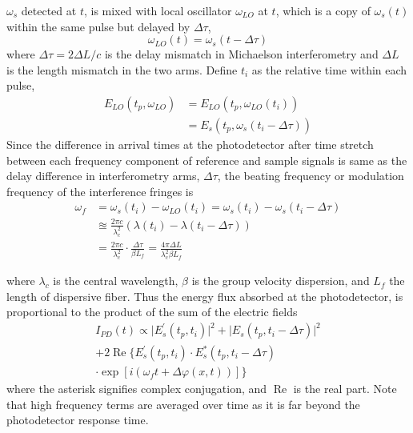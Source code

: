 \documentclass[aps,pra,reprint,superscriptaddress]{revtex4-1}
\begin{document}
$\omega_s$ detected at $t$, is mixed with local oscillator $\omega_{LO}$ at $t$, which is a copy of $\omega_s(t)$ within the same pulse but delayed by $\Delta\tau$,
\begin{equation}
\omega_{LO}(t) = \omega_s(t-\Delta\tau)
\end{equation}
where $\Delta\tau = 2 \Delta L/c$ is the delay mismatch in Michaelson interferometry and $\Delta L$ is the length mismatch in the two arms. Define $t_i$ as the relative time within each pulse,
\begin{equation}
\begin{split}
E_{LO}(t_p,\omega_{LO}) &= E_{LO}(t_p,\omega_{LO}(t_i)) \\
&= E_s(t_p,\omega_s(t_i-\Delta\tau))
\end{split}
\end{equation}
Since the difference in arrival times at the photodetector after time stretch between each frequency component of reference and sample signals is same as the delay difference in interferometry arms, $\Delta\tau$, the beating frequency or modulation frequency of the interference fringes is
\begin{align}
\omega_f & = \omega_s(t_i ) - \omega_{LO}(t_i ) = \omega_s(t_i ) - \omega_s(t_i-\Delta\tau)\\
& \approxeq \frac{2\pi c}{\lambda_c^2} (\lambda(t_i) - \lambda(t_i-\Delta\tau))\\
& = \frac{2\pi c}{\lambda_c^2} \cdot \frac{\Delta\tau}{\beta L_f} = \frac{4\pi\Delta L}{\lambda_c^2 \beta L_f}
\end{align}

where $\lambda_c$ is the central wavelength, $\beta$ is the group velocity dispersion, and $L_f$ the length of dispersive fiber. Thus the energy flux absorbed at the photodetector, is proportional to the product of the sum of the electric fields
\begin{multline}
I_{PD}(t) \propto \lvert E_s^\prime(t_p,t_i) \rvert^2 + \lvert E_s(t_p,t_i-\Delta\tau) \rvert^2\\
+ 2 \operatorname{Re}\lbrace E_s^\prime(t_p,t_i) \cdot E_s^*(t_p,t_i-\Delta\tau)\\
\cdot \exp[i(\omega_f t + \Delta\varphi(x,t))] \rbrace
\end{multline}
where the asterisk signifies complex conjugation, and $\operatorname{Re}$ is the real part. Note that high frequency terms are averaged over time as it is far beyond the photodetector response time. 
\end{document}

